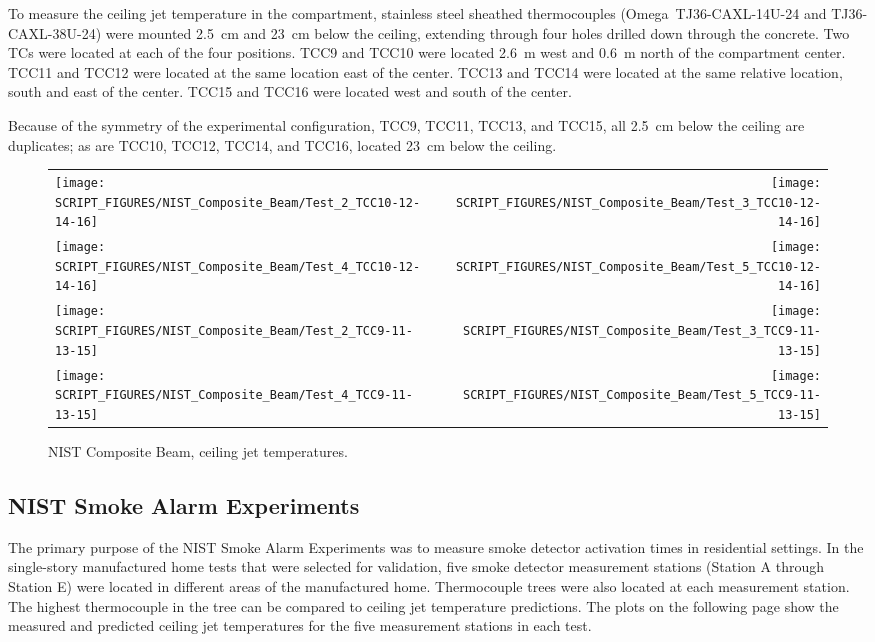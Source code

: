 To measure the ceiling jet temperature in the compartment, stainless steel sheathed thermocouples (Omega~TJ36-CAXL-14U-24 and TJ36-CAXL-38U-24) were mounted 2.5~cm and 23~cm below the ceiling, extending through four holes drilled down through the concrete. Two TCs were located at each of the four positions. TCC9 and TCC10 were located 2.6~m west and 0.6~m north of the compartment center. TCC11 and TCC12 were located at the same location east of the center. TCC13 and TCC14 were located at the same relative location, south and east of the center. TCC15 and TCC16 were located west and south of the center.

Because of the symmetry of the experimental configuration, TCC9, TCC11, TCC13, and TCC15, all 2.5~cm below the ceiling are duplicates; as are TCC10, TCC12, TCC14, and TCC16, located 23~cm below the ceiling.

\newpage

\begin{figure}[p]
\begin{tabular*}{\textwidth}{l@{\extracolsep{\fill}}r}
\texttt{[image: SCRIPT\_FIGURES/NIST\_Composite\_Beam/Test\_2\_TCC10-12-14-16]} &
\texttt{[image: SCRIPT\_FIGURES/NIST\_Composite\_Beam/Test\_3\_TCC10-12-14-16]} \\
\texttt{[image: SCRIPT\_FIGURES/NIST\_Composite\_Beam/Test\_4\_TCC10-12-14-16]} &
\texttt{[image: SCRIPT\_FIGURES/NIST\_Composite\_Beam/Test\_5\_TCC10-12-14-16]} \\
\texttt{[image: SCRIPT\_FIGURES/NIST\_Composite\_Beam/Test\_2\_TCC9-11-13-15]} &
\texttt{[image: SCRIPT\_FIGURES/NIST\_Composite\_Beam/Test\_3\_TCC9-11-13-15]} \\
\texttt{[image: SCRIPT\_FIGURES/NIST\_Composite\_Beam/Test\_4\_TCC9-11-13-15]} &
\texttt{[image: SCRIPT\_FIGURES/NIST\_Composite\_Beam/Test\_5\_TCC9-11-13-15]}
\end{tabular*}
\caption[NIST Composite Beam, ceiling jet temperatures]
{NIST Composite Beam, ceiling jet temperatures.}
\label{NIST_CB_cj}
\end{figure}


\clearpage

\subsection{NIST Smoke Alarm Experiments}

The primary purpose of the NIST Smoke Alarm Experiments was to measure smoke detector activation times in residential settings. In the single-story manufactured home tests that were selected for validation, five smoke detector measurement stations (Station A through Station E) were located in different areas of the manufactured home. Thermocouple trees were also located at each measurement station. The highest thermocouple in the tree can be compared to ceiling jet temperature predictions. The plots on the following page show the measured and predicted ceiling jet temperatures for the five measurement stations in each test.

